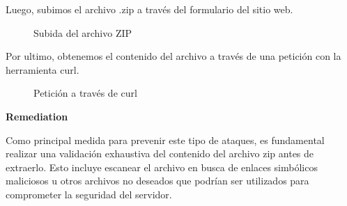 \documentclass[a4paper]{article} %
\begin{document}
    \clearpage

    Luego, subimos el archivo .zip a través del formulario del sitio web.

    \begin{figure}[h]
	\centering
	\setlength{\fboxrule}{0.5pt}
	\caption{Subida del archivo ZIP}
    \end{figure}

    Por ultimo, obtenemos el contenido del archivo a través de una petición con la herramienta curl.

    \begin{figure}[h]
	\centering
	\setlength{\fboxrule}{0.5pt}
	\caption{Petición a través de curl}
    \end{figure}

    \clearpage

    \textbf{Remediation}

    Como principal medida para prevenir este tipo de ataques, es fundamental realizar una validación exhaustiva del contenido del archivo zip antes de extraerlo. Esto incluye escanear el archivo en busca de enlaces simbólicos maliciosos u otros archivos no deseados que podrían ser utilizados para comprometer la seguridad del servidor.
\end{document}
